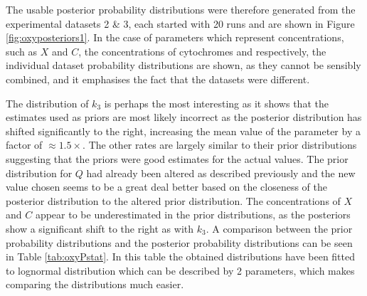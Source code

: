 The usable posterior probability distributions were therefore generated from the experimental datasets 2 \& 3, each started with 20 runs and are shown in Figure \ref{fig:oxyposteriors1}. In the case of parameters which represent concentrations, such as $X$ and $C$, the concentrations of cytochromes and \cbbthree{} respectively, the individual dataset probability distributions are shown, as they cannot be sensibly combined, and it emphasises the fact that the datasets were different.

The distribution of $k_3$ is perhaps the most interesting as it shows that the estimates used as priors are most likely incorrect as the posterior distribution has shifted significantly to the right, increasing the mean value of the parameter by a factor of $\approx 1.5 \times$. The other rates are largely similar to their prior distributions suggesting that the priors were good estimates for the actual values. The prior distribution for $Q$ had already been altered as described previously and the new value chosen seems to be a great deal better based on the closeness of the posterior distribution to the altered prior distribution. The concentrations of $X$ and $C$ appear to be underestimated in the prior distributions, as the posteriors show a significant shift to the right as with $k_3$. A comparison between the prior probability distributions and the posterior probability distributions can be seen in Table \ref{tab:oxyPstat}. In this table the obtained distributions have been fitted to lognormal 
distribution which can be described by 2 parameters, which makes comparing the distributions much easier.
